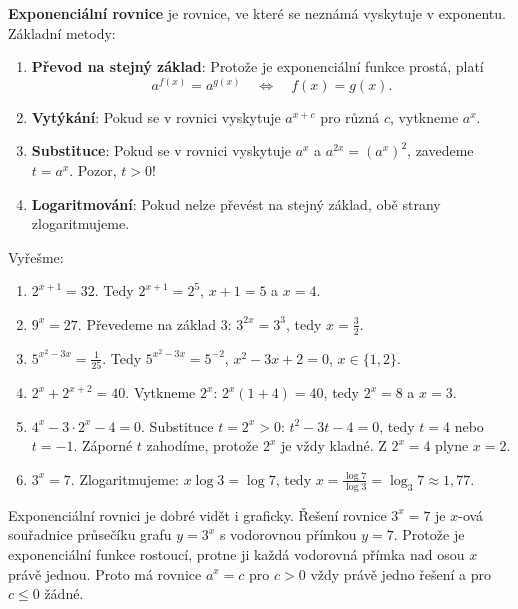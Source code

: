 \begin{definitionbox}
  \textbf{Exponenciální rovnice} je rovnice, ve které se neznámá vyskytuje v exponentu. Základní metody:
  \begin{enumerate}
    \item \textbf{Převod na stejný základ}: Protože je exponenciální funkce prostá, platí
    \begin{equation*}
      a^{f(x)} = a^{g(x)}\quad\Leftrightarrow\quad f(x) = g(x).
    \end{equation*}
    \item \textbf{Vytýkání}: Pokud se v rovnici vyskytuje $a^{x + c}$ pro různá $c$, vytkneme $a^x$.
    \item \textbf{Substituce}: Pokud se v rovnici vyskytuje $a^x$ a $a^{2x} = {(a^x)}^2$, zavedeme $t = a^x$. Pozor, $t > 0$!
    \item \textbf{Logaritmování}: Pokud nelze převést na stejný základ, obě strany zlogaritmujeme.
  \end{enumerate}
\end{definitionbox}

\begin{example}
  Vyřešme:
  \begin{enumerate}[label=(\alph*)]
    \item $2^{x + 1} = 32$. Tedy $2^{x + 1} = 2^5$, $x + 1 = 5$ a $x = 4$.
    \item $9^x = 27$. Převedeme na základ $3$: $3^{2x} = 3^3$, tedy $x = \frac{3}{2}$.
    \item $5^{x^2 - 3x} = \frac{1}{25}$. Tedy $5^{x^2 - 3x} = 5^{-2}$, $x^2 - 3x + 2 = 0$, $x\in\{1, 2\}$.
    \item $2^x + 2^{x + 2} = 40$. Vytkneme $2^x$: $2^x(1 + 4) = 40$, tedy $2^x = 8$ a $x = 3$.
    \item $4^x - 3\cdot 2^x - 4 = 0$. Substituce $t = 2^x > 0$: $t^2 - 3t - 4 = 0$, tedy $t = 4$ nebo $t = -1$. Záporné $t$ zahodíme, protože $2^x$ je vždy kladné. Z $2^x = 4$ plyne $x = 2$.
    \item $3^x = 7$. Zlogaritmujeme: $x\log 3 = \log 7$, tedy $x = \frac{\log 7}{\log 3} = \log_3 7\approx 1{,}77$.
  \end{enumerate}
\end{example}

Exponenciální rovnici je dobré vidět i graficky. Řešení rovnice $3^x = 7$ je $x$-ová souřadnice průsečíku grafu $y = 3^x$ s vodorovnou přímkou $y = 7$. Protože je exponenciální funkce rostoucí, protne ji každá vodorovná přímka nad osou $x$ právě jednou. Proto má rovnice $a^x = c$ pro $c > 0$ vždy právě jedno řešení a pro $c\leq 0$ žádné.

